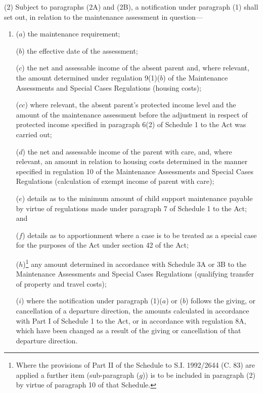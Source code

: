 \documentclass[a4paper]{article}
\begin{document}
(2) 
Subject to 
  paragraphs (2A) and (2B),  %
a notification under paragraph (1)  %
shall set out, in relation to the maintenance assessment in question—
\begin{enumerate}\item[]
($a$) the maintenance requirement;

($b$) the effective date of the assessment;


($c$) the net and assessable income of the absent parent and, where relevant, the amount determined under regulation 9(1)($b$) of the Maintenance Assessments and Special Cases Regulations (housing costs);

($cc$) where relevant, the absent parent’s protected income level and the amount of the maintenance assessment before the adjustment in respect of protected income specified in paragraph 6(2) of Schedule 1 to the Act was carried out;


($d$) the net and assessable income of the parent with care, and, where relevant, an amount in relation to housing costs determined in the manner specified in regulation 10 of the Maintenance Assessments and Special Cases Regulations (calculation of exempt income of parent with care);

($e$) details as to the minimum amount of child support maintenance payable by virtue of regulations made under paragraph 7 of Schedule 1 to the Act; and

($f$) details as to apportionment where a case is to be treated as a special case for the purposes of the Act under section 42 of the Act;

($h$)\footnote{\frenchspacing Where the provisions of Part II of the Schedule to S.I. 1992/2644 (C. 83) are applied a further item (sub-paragraph ($g$)) is to be included in paragraph (2) by virtue of paragraph 10 of that Schedule.} any amount determined in accordance with Schedule 3A or 3B to the Maintenance Assessments and Special Cases Regulations (qualifying transfer of property and travel costs);

($i$) where the notification under paragraph (1)($a$) or ($b$) follows the giving, or cancellation of a departure direction, the amounts calculated in accordance with Part I of Schedule 1 to the Act, or in accordance with regulation 8A, which have been changed as a result of the giving or cancellation of that departure direction.
\end{enumerate}
\end{document}
